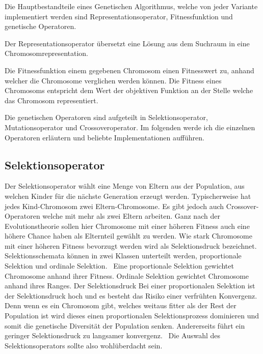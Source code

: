 Die Hauptbestandteile eines Genetischen Algorithmus, welche von jeder Variante implementiert werden
sind Representationsoperator, Fitnessfunktion und genetische Operatoren.

Der Representationsoperator übersetzt eine Lösung aus dem Suchraum in eine Chromosomrepresentation.

Die Fitnessfunktion einem gegebenen Chromosom einen Fitnesswert zu, anhand welcher
die Chromosome verglichen werden können. Die Fitness eines Chromosoms entspricht 
dem Wert der objektiven Funktion an der Stelle welche das Chromosom representiert.~\cite*{TerminologiesAndOperators}

Die genetischen Operatoren sind aufgeteilt in Selektionsoperator, Mutationsoperator und
Crossoveroperator. Im folgenden werde ich die einzelnen Operatoren erläutern und 
beliebte Implementationen aufführen. 

\subsection{Selektionsoperator}
Der Selektionsoperator wählt eine Menge von Eltern aus der Population, aus 
welchen Kinder für die nächste Generation erzeugt werden.
Typischerweise hat jedes Kind-Chromosom zwei Eltern-Chromosome. Es gibt jedoch auch 
Crossover-Operatoren welche mit mehr als zwei Eltern arbeiten.
Ganz nach der Evolutionstheorie sollen hier Chromosome mit einer höheren Fitness
auch eine höhere Chance haben als Elternteil gewählt zu werden.
Wie stark Chromosome mit einer höheren Fitness bevorzugt werden wird als Selektionsdruck bezeichnet.
Selektionsschemata können in zwei Klassen unterteilt werden, proportionale Selektion 
und ordinale Selektion.~\cite*{TerminologiesAndOperators} Eine proportionale Selektion gewichtet Chromosome anhand ihrer Fitness.
Ordinale Selektion gewichtet Chromosome anhand ihres Ranges.
Der Selektionsdruck
Bei einer proportionalen Selektion ist der Selektionsdruck hoch und es besteht das Risiko einer verfrühten Konvergenz.
Denn wenn es ein Chromosom gibt, welches weitaus fitter als der Rest der Population ist 
wird dieses einen proportionalen Selektionsprozess dominieren und somit die genetische 
Diversität der Population senken.
Andererseits führt ein geringer Selektionsdruck zu langsamer konvergenz.~\cite*{TerminologiesAndOperators}
Die Auswahl des Selektionsoperators sollte also wohlüberdacht sein.

